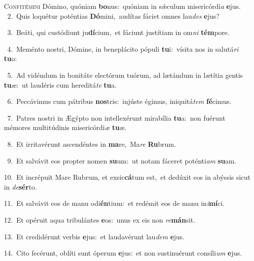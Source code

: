 \lettrine{\initial\textcolor{\initialcolor}{C}}{onfitémini} Dómino, quóniam \textbf{bo}\-nus:~\star quóniam in sǽculum misericórdi\textit{a} \textbf{e}\-jus.\\
{\numbfont\textcolor{\numbcolor}{~2.}}~Quis loquétur poténtias \textbf{Dó}\-mini,~\star audítas fáciet omnes lau\textit{des} \textbf{e}\-jus?\par
{\numbfont\textcolor{\numbcolor}{~3.}}~Beáti, qui custódiunt ju\-\textbf{dí}\-cium,~\star et fáciunt justítiam in om\textit{ni} \textbf{tém}\-pore.\par
{\numbfont\textcolor{\numbcolor}{~4.}}~Meménto nostri, Dómine, in beneplácito pópuli \textbf{tu}\-i:~\star vísita nos in salutá\textit{ri} \textbf{tu}\-o:\par
{\numbfont\textcolor{\numbcolor}{~5.}}~Ad vidéndum in bonitáte electórum tuórum, ad lætándum in lætítia gentis \textbf{tu}\-æ:~\star ut laudéris cum hereditá\textit{te} \textbf{tu}\-a.\par
{\numbfont\textcolor{\numbcolor}{~6.}}~Peccávimus cum pátribus \textbf{nos}\-tris:~\star injúste égimus, iniquitá\textit{tem} \textbf{fé}\-cimus.\par
{\numbfont\textcolor{\numbcolor}{~7.}}~Patres nostri in Ægýpto non intellexérunt mirabília \textbf{tu}\-a:~\star non fuérunt mémores multitúdinis misericórdi\textit{æ} \textbf{tu}\-æ.\par
{\numbfont\textcolor{\numbcolor}{~8.}}~Et irritavérunt ascendéntes in \textbf{ma}\-re,~\star Ma\textit{re} \textbf{Ru}\-brum.\par
{\numbfont\textcolor{\numbcolor}{~9.}}~Et salvávit eos propter nomen \textbf{su}\-um:~\star ut notam fáceret poténti\textit{am} \textbf{su}\-am.\par
{\numbfont\textcolor{\numbcolor}{10.}}~Et incrépuit Mare Rubrum, et exsic\-\textbf{cá}\-tum est,~\star et dedúxit eos in abýssis sicut in \textit{de}\-\textbf{sér}to.\par
{\numbfont\textcolor{\numbcolor}{11.}}~Et salvávit eos de manu odi\-\textbf{én}\-tium:~\star et redémit eos de manu in\-\textit{i}\-\textbf{mí}ci.\par
{\numbfont\textcolor{\numbcolor}{12.}}~Et opéruit aqua tribulántes \textbf{e}\-os:~\star unus ex eis non \textit{re}\-\textbf{mán}sit.\par
{\numbfont\textcolor{\numbcolor}{13.}}~Et credidérunt verbis \textbf{e}\-jus:~\star et laudavérunt lau\textit{dem} \textbf{e}\-jus.\par
{\numbfont\textcolor{\numbcolor}{14.}}~Cito fecérunt, oblíti sunt óperum \textbf{e}\-jus:~\star et non sustinuérunt consíli\textit{um} \textbf{e}\-jus.\par

